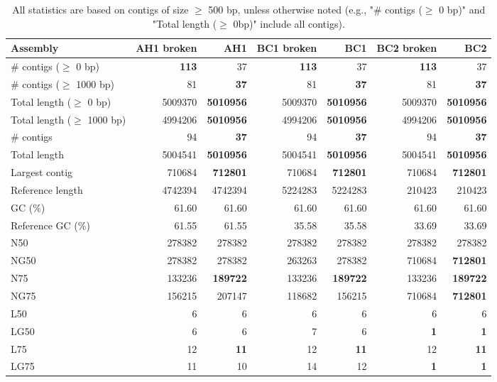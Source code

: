 \documentclass[12pt,a4paper]{article}
\begin{document}
\begin{table}[ht]
\begin{center}
\caption{All statistics are based on contigs of size $\geq$ 500 bp, unless otherwise noted (e.g., "\# contigs ($\geq$ 0 bp)" and "Total length ($\geq$ 0bp)" include all contigs).}
\begin{tabular}{|l*{6}{|r}|}
\hline
Assembly & AH1 broken & AH1 & BC1 broken & BC1 & BC2 broken & BC2 \\ \hline
\# contigs ($\geq$ 0 bp) & {\bf 113} & 37 & {\bf 113} & 37 & {\bf 113} & 37 \\ \hline
\# contigs ($\geq$ 1000 bp) & 81 & {\bf 37} & 81 & {\bf 37} & 81 & {\bf 37} \\ \hline
Total length ($\geq$ 0 bp) & 5009370 & {\bf 5010956} & 5009370 & {\bf 5010956} & 5009370 & {\bf 5010956} \\ \hline
Total length ($\geq$ 1000 bp) & 4994206 & {\bf 5010956} & 4994206 & {\bf 5010956} & 4994206 & {\bf 5010956} \\ \hline
\# contigs & 94 & {\bf 37} & 94 & {\bf 37} & 94 & {\bf 37} \\ \hline
Total length & 5004541 & {\bf 5010956} & 5004541 & {\bf 5010956} & 5004541 & {\bf 5010956} \\ \hline
Largest contig & 710684 & {\bf 712801} & 710684 & {\bf 712801} & 710684 & {\bf 712801} \\ \hline
Reference length & 4742394 & 4742394 & 5224283 & 5224283 & 210423 & 210423 \\ \hline
GC (\%) & 61.60 & 61.60 & 61.60 & 61.60 & 61.60 & 61.60 \\ \hline
Reference GC (\%) & 61.55 & 61.55 & 35.58 & 35.58 & 33.69 & 33.69 \\ \hline
N50 & 278382 & 278382 & 278382 & 278382 & 278382 & 278382 \\ \hline
NG50 & 278382 & 278382 & 263263 & 278382 & 710684 & {\bf 712801} \\ \hline
N75 & 133236 & {\bf 189722} & 133236 & {\bf 189722} & 133236 & {\bf 189722} \\ \hline
NG75 & 156215 & 207147 & 118682 & 156215 & 710684 & {\bf 712801} \\ \hline
L50 & 6 & 6 & 6 & 6 & 6 & 6 \\ \hline
LG50 & 6 & 6 & 7 & 6 & {\bf 1} & {\bf 1} \\ \hline
L75 & 12 & {\bf 11} & 12 & {\bf 11} & 12 & {\bf 11} \\ \hline
LG75 & 11 & 10 & 14 & 12 & {\bf 1} & {\bf 1} \\ \hline

\end{tabular}
\end{center}
\end{table}
\end{document}
